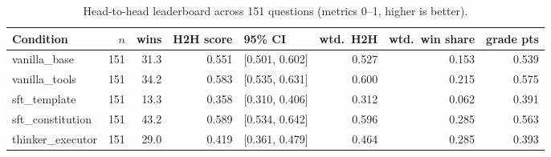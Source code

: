 \begin{table}[htbp]
  \centering
  \caption{Head-to-head leaderboard across 151 questions (metrics 0--1, higher is better).}
  \label{tab:rank-overall}
  \small
  \begin{tabular}{lrrrlrrr}
    \toprule
    Condition & $n$ & wins & H2H score & 95\% CI & wtd.\ H2H & wtd.\ win share & grade pts \\
    \midrule
    vanilla\_base & 151 & 31.3 & 0.551 & [0.501, 0.602] & 0.527 & 0.153 & 0.539 \\
    vanilla\_tools & 151 & 34.2 & 0.583 & [0.535, 0.631] & 0.600 & 0.215 & 0.575 \\
    sft\_template & 151 & 13.3 & 0.358 & [0.310, 0.406] & 0.312 & 0.062 & 0.391 \\
    sft\_constitution & 151 & 43.2 & 0.589 & [0.534, 0.642] & 0.596 & 0.285 & 0.563 \\
    thinker\_executor & 151 & 29.0 & 0.419 & [0.361, 0.479] & 0.464 & 0.285 & 0.393 \\
    \bottomrule
  \end{tabular}
\end{table}
